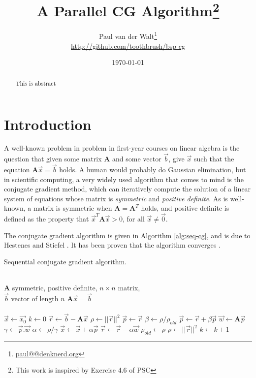 \documentclass[a4paper]{article}
\author{Paul van der Walt\footnote{\url{paul@@denknerd.org}}\\ \url{http://github.com/toothbrush/bsp-cg}}
\date{\today}
\title{A Parallel CG Algorithm\footnote{This work is inspired by Exercise 4.6 of PSC\cite{bisseling2004parallel}}}
\begin{document}
\maketitle

\begin{abstract}
    This is abstract
\end{abstract}

\newcommand{\ve}[1]{\ensuremath{\vec{#1}}}
\newcommand{\mat}[1]{\ensuremath{\boldsymbol{#1}}}
\newcommand{\plotsize}{0.7\textwidth}
\newcommand{\legendplotsize}{1.3\textwidth}
\section{Introduction}

A well-known problem in problem in first-year courses on linear algebra is the question that
given some matrix \mat{A} and some vector \ve{b}, give \ve{x} such that the equation $\mat A \ve x = \ve b$ holds. A human would probably do Gaussian elimination, but
in scientific computing, a very widely used algorithm that comes to mind is the conjugate gradient method, which can iteratively compute the solution of a linear system of equations whose matrix is \emph{symmetric} and \emph{positive definite}.
As is well-known, a matrix is symmetric when $\mat A = \mat A^T$ holds, and positive definite is defined as the property that $\ve x^T \mat A \ve x > 0$, for all $\ve x \neq \ve 0$.

The conjugate gradient algorithm is given in Algorithm \ref{alg:seq-cg}, and is due to Hestenes and Stiefel \cite{hestenes1952methods}. It has been proven that the algorithm converges \cite{golub1996matrix}.

\begin{algorithm}
    \caption{Sequential conjugate gradient algorithm.}
\label{alg:seq-cg}
\begin{algorithmic}
    \REQUIRE ~\\
             $\mat A$ symmetric, positive definite, $n\times n$ matrix,\\
             $\ve  b$ vector of length $n$
    \ENSURE  $\mat A \ve x = \ve b$\\~\\
    \STATE $\ve x \leftarrow \ve{x_0}$ 
    \STATE $k \leftarrow 0$ 
    \STATE $\ve r \leftarrow \ve b - \mat A \ve x$
    \STATE $\rho \leftarrow ||\ve r||^2$
    \WHILE{$\sqrt{\rho} > \epsilon ||\ve b|| \wedge k < k_{max}$}
            \STATE $\ve p \leftarrow \ve r$
        \ELSE
            \STATE $\beta \leftarrow \rho/\rho_{old}$
            \STATE $\ve p \leftarrow \ve r + \beta \ve p$
        \ENDIF
        \STATE $\vec w \leftarrow \mat A \ve p$
        \STATE $\gamma \leftarrow \ve p . \ve w$
        \STATE $\alpha \leftarrow \rho/\gamma$
        \STATE $\ve x  \leftarrow \ve x + \alpha \ve p$
        \STATE $\ve r  \leftarrow \ve r - \alpha \ve w$
        \STATE $\rho_{old} \leftarrow \rho$
        \STATE $\rho   \leftarrow || \ve r || ^2$
        \STATE $k \leftarrow k+1$
    \ENDWHILE
\end{algorithmic}
\end{algorithm}
\end{document}

